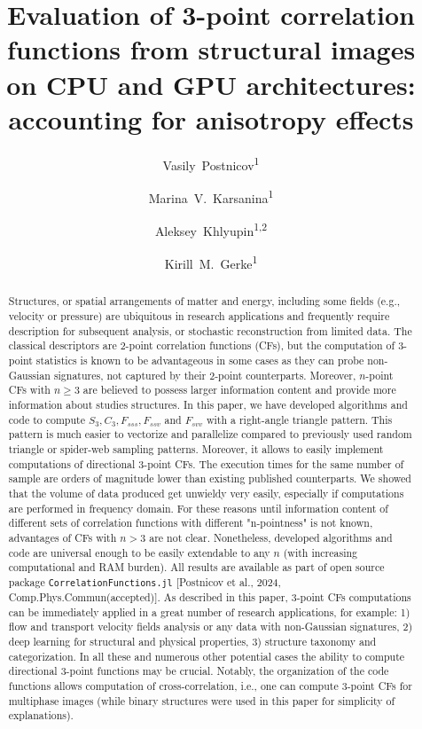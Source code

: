 \documentclass[reprint,amsmath,amssymb,aps,pre,showkeys,showpacs]{revtex4-1}
\newcommand{\code}[1]{\colorbox{light-gray}{\texttt{#1}}}
\begin{document}

\author{Vasily~Postnicov\textsuperscript{1}}
\author{Marina~V.~Karsanina\textsuperscript{1}}
\author{Aleksey~Khlyupin\textsuperscript{1,2}}
\author{Kirill~M.~Gerke\textsuperscript{1}}


\title{Evaluation of 3-point correlation functions from structural images on CPU
  and GPU architectures: accounting for anisotropy effects}

\begin{abstract}
Structures, or spatial arrangements of matter and energy, including some fields
(e.g., velocity or pressure) are ubiquitous in research applications and
frequently require description for subsequent analysis, or stochastic
reconstruction from limited data.  The classical descriptors are 2-point
correlation functions (CFs), but the computation of 3-point statistics is known
to be advantageous in some cases as they can probe non-Gaussian signatures, not
captured by their 2-point counterparts. Moreover, $n$-point CFs with $n \ge 3$
are believed to possess larger information content and provide more information
about studies structures. In this paper, we have developed algorithms and code
to compute $S_3, C_3, F_{sss}, F_{ssv}$ and $F_{svv}$ with a right-angle
triangle pattern. This pattern is much easier to vectorize and parallelize
compared to previously used random triangle or spider-web sampling
patterns. Moreover, it allows to easily implement computations of directional
3-point CFs. The execution times for the same number of sample are orders of
magnitude lower than existing published counterparts. We showed that the volume
of data produced get unwieldy very easily, especially if computations are
performed in frequency domain. For these reasons until information content of
different sets of correlation functions with different "n-pointness" is not
known, advantages of CFs with $n>3$ are not clear. Nonetheless, developed
algorithms and code are universal enough to be easily extendable to any $n$
(with increasing computational and RAM burden). All results are available as
part of open source package \code{CorrelationFunctions.jl} [Postnicov et al.,
  2024, Comp.Phys.Commun(accepted)]. As described in this paper, 3-point CFs
computations can be immediately applied in a great number of research
applications, for example: 1) flow and transport velocity fields analysis or any
data with non-Gaussian signatures, 2) deep learning for structural and physical
properties, 3) structure taxonomy and categorization.  In all these and numerous
other potential cases the ability to compute directional 3-point functions may
be crucial. Notably, the organization of the code functions allows computation
of cross-correlation, i.e., one can compute 3-point CFs for multiphase images
(while binary structures were used in this paper for simplicity of
explanations).
\end{abstract}
\end{document}
